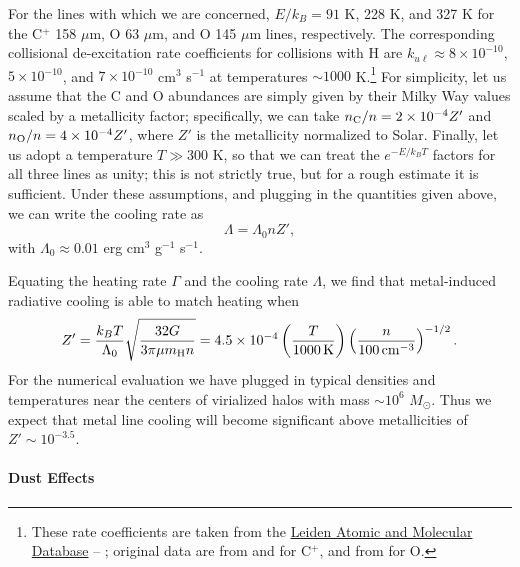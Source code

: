For the lines with which we are concerned, $E/k_B = 91$ K, 228 K, and 327 K for the C$^+$ 158 $\mu$m, O 63 $\mu$m, and O 145 $\mu$m lines, respectively. The corresponding collisional de-excitation rate coefficients for collisions with H are $k_{u\ell}\approx 8\times 10^{-10}$, $5\times 10^{-10}$, and $7\times 10^{-10}$ cm$^3$ s$^{-1}$ at temperatures $\sim 1000$ K.\footnote{These rate coefficients are taken from the \href{http://home.strw.leidenuniv.nl/~moldata/}{Leiden Atomic and Molecular Database} -- \citet{schoier05a}; original data are from \citet{launay77a} and \citet{barinovs05a} for C$^+$, and from \citet{abrahamsson07a} for O.} For simplicity, let us assume that the C and O abundances are simply given by their Milky Way values scaled by a metallicity factor; specifically, we can take $n_{\rm C}/n = 2\times 10^{-4} Z'$ and $n_{\rm O}/n = 4\times 10^{-4} Z'$, where $Z'$ is the metallicity normalized to Solar. Finally, let us adopt a temperature $T \gg 300$ K, so that we can treat the $e^{-E/k_B T}$ factors for all three lines as unity; this is not strictly true, but for a rough estimate it is sufficient. Under these assumptions, and plugging in the quantities given above, we can write the cooling rate as
\begin{equation}
\Lambda = \Lambda_0 n Z',
\end{equation}
with $\Lambda_0 \approx 0.01$ erg cm$^3$ g$^{-1}$ s$^{-1}$.

Equating the heating rate $\Gamma$ and the cooling rate $\Lambda$, we find that metal-induced radiative cooling is able to match heating when
\begin{equation}
Z' = \frac{k_B T}{\Lambda_0} \sqrt{\frac{32 G}{3\pi \mu m_{\rm H} n}} = 4.5\times 10^{-4} \left(\frac{T}{1000\,\mathrm{K}}\right)\left(\frac{n}{100\,\mathrm{cm}^{-3}}\right)^{-1/2}.
\end{equation}
For the numerical evaluation we have plugged in typical densities and temperatures near the centers of virialized halos with mass $\sim 10^6$ $M_\odot$. Thus we expect that metal line cooling will become significant above metallicities of $Z'\sim 10^{-3.5}$.


\paragraph{Dust Effects}

